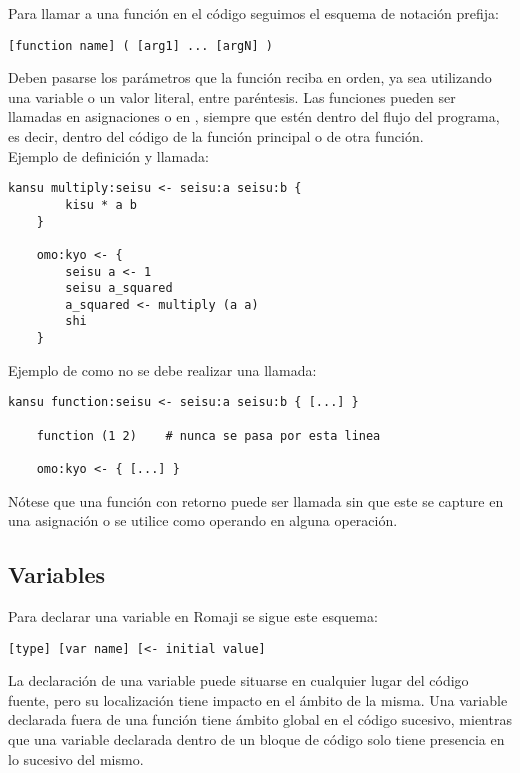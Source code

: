 \documentclass[spanish]{article}
\begin{document}
Para llamar a una función en el código seguimos el esquema de notación prefija:

\begin{lstlisting}[language=Romaji]
    [function name] ( [arg1] ... [argN] )
\end{lstlisting}

Deben pasarse los parámetros que la función reciba en orden, ya sea utilizando una variable o un valor literal, entre paréntesis. Las funciones pueden ser llamadas en asignaciones o en , siempre que estén dentro del flujo del programa, es decir, dentro del código de la función principal o de otra función.\\

\newpage
Ejemplo de definición y llamada:

\begin{lstlisting}[language=Romaji]
    kansu multiply:seisu <- seisu:a seisu:b {
        kisu * a b
    }
    
    omo:kyo <- {
        seisu a <- 1
        seisu a_squared
        a_squared <- multiply (a a)
        shi
    }
\end{lstlisting}

Ejemplo de como no se debe realizar una llamada:

\begin{lstlisting}[language=Romaji]
    kansu function:seisu <- seisu:a seisu:b { [...] }
    
    function (1 2)    # nunca se pasa por esta linea

    omo:kyo <- { [...] }
\end{lstlisting}

Nótese que una función con retorno puede ser llamada sin que este se capture en una asignación o se utilice como operando en alguna operación.

\subsection{Variables}
\label{sec:variables}

Para declarar una variable en Romaji se sigue este esquema:
\begin{lstlisting}[language=Romaji]
    [type] [var name] [<- initial value]
\end{lstlisting}

La declaración de una variable puede situarse en cualquier lugar del código fuente, pero su localización tiene impacto en el ámbito de la misma. Una variable declarada fuera de una función tiene ámbito global en el código sucesivo, mientras que una variable declarada dentro de un bloque de código solo tiene presencia en lo sucesivo del mismo.
\end{document}
